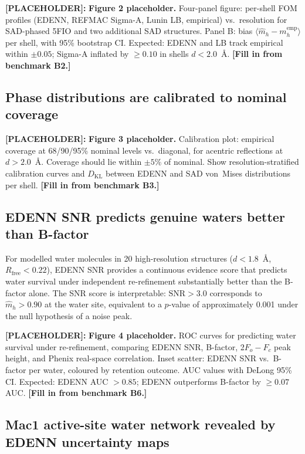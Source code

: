 \documentclass[10pt,twocolumn]{article}
\newcommand{\placeholder}[1]{%
  \begin{mdframed}[
    linecolor=placeholder,linewidth=1pt,
    backgroundcolor=red!5,
    innertopmargin=6pt,innerbottommargin=6pt,
    innerleftmargin=8pt,innerrightmargin=8pt]
  \small\color{placeholder}\textbf{[PLACEHOLDER]:} #1
  \end{mdframed}
}
\newcommand{\SNR}{\mathrm{SNR}}
\begin{document}
\placeholder{
\textbf{Figure 2 placeholder.}
Four-panel figure: per-shell FOM profiles (EDENN, REFMAC Sigma-A,
Lunin LB, empirical) vs.\ resolution for SAD-phased 5FIO and two
additional SAD structures.
Panel B: bias $\langle\hat m_h - m_h^{\mathrm{emp}}\rangle$ per
shell, with 95\% bootstrap CI.
Expected: EDENN and LB track empirical within $\pm 0.05$;
Sigma-A inflated by $\geq 0.10$ in shells $d < 2.0$~\AA.
\textbf{[Fill in from benchmark B2.]}
}

\subsection{Phase distributions are calibrated to nominal coverage}

\placeholder{
\textbf{Figure 3 placeholder.}
Calibration plot: empirical coverage at 68/90/95\% nominal levels
vs.\ diagonal, for acentric reflections at $d > 2.0$~\AA.
Coverage should lie within $\pm 5$\% of nominal.
Show resolution-stratified calibration curves and
$D_{\mathrm{KL}}$ between EDENN and SAD von~Mises distributions
per shell.
\textbf{[Fill in from benchmark B3.]}
}

\subsection{EDENN SNR predicts genuine waters better than B-factor}

For modelled water molecules in 20 high-resolution structures
($d < 1.8$~\AA, $R_{\mathrm{free}} < 0.22$), EDENN SNR provides
a continuous evidence score that predicts water survival under
independent re-refinement substantially better than the B-factor
alone.
The SNR score is interpretable: $\SNR > 3.0$ corresponds to
$\hat m_h > 0.90$ at the water site, equivalent to a $p$-value of
approximately 0.001 under the null hypothesis of a noise peak.

\placeholder{
\textbf{Figure 4 placeholder.}
ROC curves for predicting water survival under re-refinement,
comparing EDENN SNR, B-factor, 2$F_o-F_c$ peak height, and
Phenix real-space correlation.
Inset scatter: EDENN SNR vs.\ B-factor per water, coloured by
retention outcome.
AUC values with DeLong 95\% CI.
Expected: EDENN AUC $> 0.85$; EDENN outperforms B-factor by
$\geq 0.07$ AUC.
\textbf{[Fill in from benchmark B6.]}
}

\subsection{Mac1 active-site water network revealed by EDENN
uncertainty maps}
\end{document}
